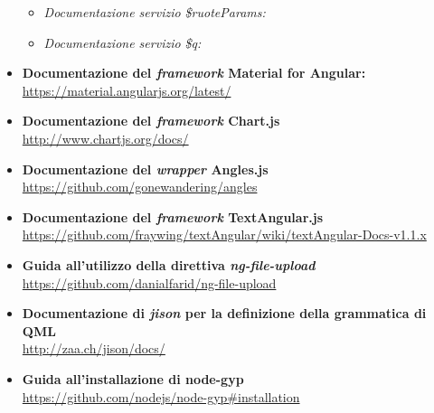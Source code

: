 \begin{itemize}
\begin{itemize}
		\item \textit{Documentazione servizio \$ruoteParams:} 
		\item \textit{Documentazione servizio \$q:} 
	\end{itemize}
	\item \textbf{Documentazione del \textit{framework} Material for Angular:} \\
		\url{https://material.angularjs.org/latest/}
	\item \textbf{Documentazione del \textit{framework} Chart.js} \\
		\url{http://www.chartjs.org/docs/}
	\item \textbf{Documentazione del \textit{wrapper} Angles.js} \\
		\url{https://github.com/gonewandering/angles}
	\item \textbf{Documentazione del \textit{framework} TextAngular.js} \\
		\url{https://github.com/fraywing/textAngular/wiki/textAngular-Docs-v1.1.x}
	\item \textbf{Guida all'utilizzo della direttiva \textit{ng-file-upload}} \\
		\url{https://github.com/danialfarid/ng-file-upload}
	\item \textbf{Documentazione di \textit{jison} per la definizione della grammatica di QML} \\
		\url{http://zaa.ch/jison/docs/}
	\item \textbf{Guida all'installazione di node-gyp}\\
		\url{https://github.com/nodejs/node-gyp#installation}
\end{itemize}